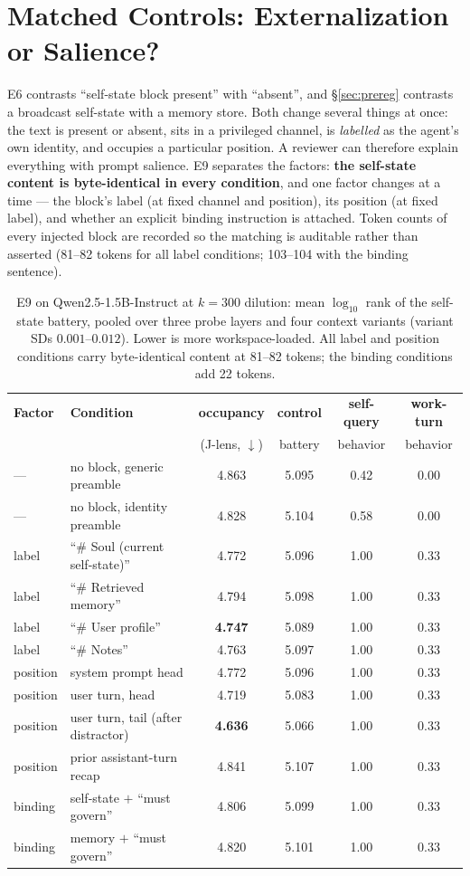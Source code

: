 \documentclass{article}
\newcommand{\jlens}{J\mbox{-}lens}
\begin{document}
\section{Matched Controls: Externalization or Salience?}
\label{sec:e9}
E6 contrasts ``self-state block present'' with ``absent'', and \S\ref{sec:prereg} contrasts a broadcast self-state with a memory store. Both change several things at once: the text is present or absent, sits in a privileged channel, is \emph{labelled} as the agent's own identity, and occupies a particular position. A reviewer can therefore explain everything with prompt salience. E9 separates the factors: \textbf{the self-state content is byte-identical in every condition}, and one factor changes at a time --- the block's label (at fixed channel and position), its position (at fixed label), and whether an explicit binding instruction is attached. Token counts of every injected block are recorded so the matching is auditable rather than asserted (81--82 tokens for all label conditions; 103--104 with the binding sentence).

\begin{table}[h]
\centering\small
\begin{tabular}{llcccc}
\toprule
\textbf{Factor} & \textbf{Condition} & \textbf{occupancy} & \textbf{control} & \textbf{self-query} & \textbf{work-turn} \\
 & & (\jlens{}, $\downarrow$) & battery & behavior & behavior \\
\midrule
--- & no block, generic preamble & 4.863 & 5.095 & 0.42 & 0.00 \\
--- & no block, identity preamble & 4.828 & 5.104 & 0.58 & 0.00 \\
\midrule
label & ``\# Soul (current self-state)'' & 4.772 & 5.096 & 1.00 & 0.33 \\
label & ``\# Retrieved memory'' & 4.794 & 5.098 & 1.00 & 0.33 \\
label & ``\# User profile'' & \textbf{4.747} & 5.089 & 1.00 & 0.33 \\
label & ``\# Notes'' & 4.763 & 5.097 & 1.00 & 0.33 \\
\midrule
position & system prompt head & 4.772 & 5.096 & 1.00 & 0.33 \\
position & user turn, head & 4.719 & 5.083 & 1.00 & 0.33 \\
position & user turn, tail (after distractor) & \textbf{4.636} & 5.066 & 1.00 & 0.33 \\
position & prior assistant-turn recap & 4.841 & 5.107 & 1.00 & 0.33 \\
\midrule
binding & self-state $+$ ``must govern'' & 4.806 & 5.099 & 1.00 & 0.33 \\
binding & memory $+$ ``must govern'' & 4.820 & 5.101 & 1.00 & 0.33 \\
\bottomrule
\end{tabular}
\caption{E9 on Qwen2.5-1.5B-Instruct at $k{=}300$ dilution: mean $\log_{10}$ rank of the self-state battery, pooled over three probe layers and four context variants (variant SDs $0.001$--$0.012$). Lower is more workspace-loaded. All label and position conditions carry byte-identical content at 81--82 tokens; the binding conditions add 22 tokens.}
\label{tab:e9}
\end{table}
\end{document}
